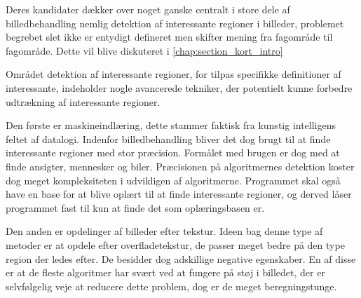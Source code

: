 {%
Deres kandidater dækker over noget ganske centralt i store dele af
billedbehandling nemlig detektion af
interessante regioner i billeder, problemet begrebet slet ikke er
entydigt defineret men skifter mening fra fagområde til fagområde.
Dette vil blive diskuteret i \ref{chap:section_kort_intro}

Området detektion af interessante regioner, for tilpas specifikke
definitioner af interessante, indeholder nogle avancerede tekniker, der
potentielt kunne forbedre udtrækning af interessante regioner.

Den første er maskineindlæring, dette stammer faktisk fra kunstig
intelligens feltet af datalogi. Indenfor billedbehandling bliver det dog
brugt til at finde interessante regioner med stor præcision. Formålet
med brugen er dog med at finde ansigter, mennesker og
biler\cite{ViolaJones01}\cite{SchneidermanKanade00}\cite{Gabor}. Præcisionen på
algoritmernes detektion koster dog meget kompleksiteten i udvikligen 
af algoritmerne. Programmet skal også have en base for at blive oplært
til at finde interessante regioner, og derved låser programmet fast til
kun at finde det som oplæringsbasen er.

Den anden er opdelinger af billeder efter tekstur. Ideen bag denne type
af metoder er at opdele efter
overfladetekstur\cite{218442}\cite{CarsonBelongie02}\cite{PapageorgiouPoggio}, de passer meget bedre på
den type region der ledes efter. De besidder dog adskillige
negative egenskaber. En af disse er at de fleste algoritmer har svært
ved at fungere på støj i billedet, der er selvfølgelig veje at reducere
dette problem, dog er de meget beregningstunge.\cite{PalPal}

}
